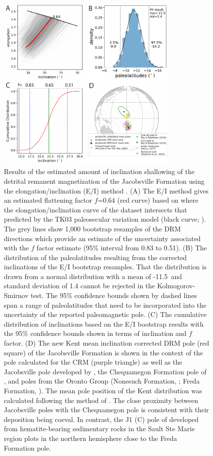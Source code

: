 \begin{figure}[h!]
\centering
\includegraphics[width=0.8\textwidth]{figure/Zhang2024a/EI_results.pdf}
\caption[Jacobsville Formation inclination shallowing correction]{\scriptsize Results of the estimated amount of inclination shallowing of the detrital remanent magnetization of the Jacobsville Formation using the elongation/inclination (E/I) method \citep{Tauxe2004b}. (A) The E/I method gives an estimated flattening factor $f$=0.64 (red curve) based on where the elongation/inclination curve of the dataset intersects that predicted by the TK03 paleosecular variation model (black curve; \citealp{Tauxe2004b}). The grey lines show 1,000 bootstrap resamples of the DRM directions which provide an estimate of the uncertainty associated with the $f$ factor estimate (95\% interval from 0.83 to 0.51). (B) The distribution of the paleolatitudes resulting from the corrected inclinations of the E/I bootstrap resamples. That the distribution is drawn from a normal distribution with a mean of -11.5\textdegree\ and standard deviation of 1.4 cannot be rejected in the Kolmogorov-Smirnov test. The 95\% confidence bounds shown by dashed lines span a range of paleolatitudes that need to be incorporated into the uncertainty of the reported paleomagnetic pole. (C) The cumulative distribution of inclinations based on the E/I bootstrap results with the 95\% confidence bounds shown in terms of inclination and $f$ factor. (D) The new Kent mean inclination corrected DRM pole (red square) of the Jacobsville Formation is shown in the context of the pole calculated for the CRM (purple triangle) as well as the Jacobsville pole developed by \cite{Roy1978a}, the Chequamegon Formation pole of \cite{McCabe1983a}, and poles from the Oronto Group (Nonesuch Formation, \citealp{Slotznick2023a}; Freda Formation, \citealp{Henry1977a}). The mean pole position of the Kent distribution was calculated following the method of \cite{Pierce2022a}. The close proximity between Jacobsville poles with the Chequamegon pole is consistent with their deposition being coeval. In contrast, the J1 (C) pole of \cite{Roy1978a} developed from hematite-bearing sedimentary rocks in the Sault Ste Marie region plots in the northern hemisphere close to the Freda Formation pole. }
\label{fig:EI_results}
\end{figure}

